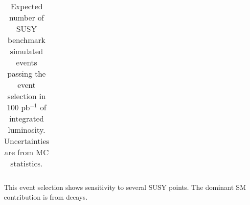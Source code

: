 \begin{table}[hbt]
\begin{center}
{\begin{tabular}{|l|c|c|c|c|c|c|c|c|c|c|}
\end{tabular} }
\caption{Expected number of SUSY benchmark simulated events  passing the event selection in 100 pb$^{-1}$ of integrated 
luminosity. Uncertainties are from MC statistics.\label{tab:yieldssusy}}

\end{center}
\end{table}
This event selection shows sensitivity to several SUSY points. 
The dominant SM contribution is from \ttbar decays. 

